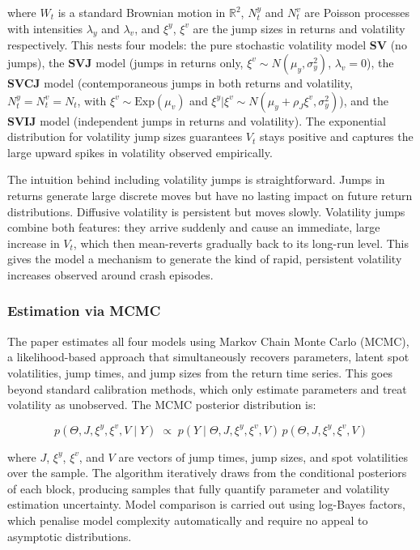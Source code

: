 \documentclass[12pt]{article}
\begin{document}
where $W_t$ is a standard Brownian motion in $\mathbb{R}^2$, $N_t^y$ and $N_t^v$
are Poisson processes with intensities $\lambda_y$ and $\lambda_v$, and $\xi^y$,
$\xi^v$ are the jump sizes in returns and volatility respectively. This nests four
models: the pure stochastic volatility model \textbf{SV} (no jumps), the
\textbf{SVJ} model (jumps in returns only, $\xi^v\sim N(\mu_y,\sigma_y^2)$,
$\lambda_v=0$), the \textbf{SVCJ} model (contemporaneous jumps in both returns
and volatility, $N_t^y=N_t^v=N_t$, with $\xi^v\sim\text{Exp}(\mu_v)$ and
$\xi^y|\xi^v\sim N(\mu_y+\rho_J\xi^v,\sigma_y^2)$), and the \textbf{SVIJ} model
(independent jumps in returns and volatility). The exponential distribution for
volatility jump sizes guarantees $V_t$ stays positive and captures the large
upward spikes in volatility observed empirically.

The intuition behind including volatility jumps is straightforward. Jumps in
returns generate large discrete moves but have no lasting impact on future
return distributions. Diffusive volatility is persistent but moves slowly.
Volatility jumps combine both features: they arrive suddenly and cause an
immediate, large increase in $V_t$, which then mean-reverts gradually back to
its long-run level. This gives the model a mechanism to generate the kind of
rapid, persistent volatility increases observed around crash episodes.

\subsubsection*{Estimation via MCMC}

The paper estimates all four models using Markov Chain Monte Carlo (MCMC),
a likelihood-based approach that simultaneously recovers parameters, latent spot
volatilities, jump times, and jump sizes from the return time series. This goes
beyond standard calibration methods, which only estimate parameters and treat
volatility as unobserved. The MCMC posterior distribution is:

\begin{equation}
p(\Theta, J, \xi^y, \xi^v, V \mid Y)
\;\propto\; p(Y \mid \Theta, J, \xi^y, \xi^v, V)\, p(\Theta, J, \xi^y, \xi^v, V)
\end{equation}

where $J$, $\xi^y$, $\xi^v$, and $V$ are vectors of jump times, jump sizes,
and spot volatilities over the sample. The algorithm iteratively draws from the
conditional posteriors of each block, producing samples that fully quantify
parameter and volatility estimation uncertainty. Model comparison is carried out
using log-Bayes factors, which penalise model complexity automatically and
require no appeal to asymptotic distributions.
\end{document}
